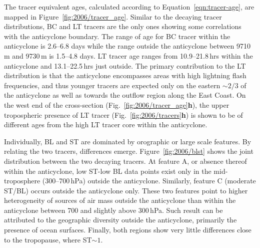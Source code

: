 
The tracer equivalent ages, calculated according to Equation~\ref{eqn:tracer-age}, are mapped in Figure~\ref{fig:2006/tracer_age}.
Similar to the decaying tracer distributions, BC and LT tracers are the only ones showing some correlations with the anticyclone boundary.
The range of age for BC tracer within the anticyclone is 2.6--6.8 days while the range outside the anticyclone between 9710\,\unit{m} and
9730\,\unit{m} is 1.5--4.8 days. LT tracer age ranges from 10.9--21.8\,\unit{hrs} within the anticyclone and 13.1--22.5\,\unit{hrs}
just outside. The primary contribution to the LT distribution is that the anticyclone encompasses areas with high lightning flash frequencies,
and thus younger tracers are expected only on the eastern $\sim2/3$ of the anticyclone as well as towards the outflow region along
the East Coast. On the west end of the cross-section (Fig.~\ref{fig:2006/tracer_age}{\bf h}), the upper tropospheric presence of LT tracer
(Fig.~\ref{fig:2006/tracers}{\bf h}) is shown to be of different ages from the high LT tracer core within the anticyclone.


Individually, BL and ST are dominated by orographic or large scale features. By relating the two tracers, differences emerge.
Figure~\ref{fig:2006/blst} shows the joint distribution between the two decaying tracers. At feature A, or absence thereof within the
anticyclone, low ST-low BL data points exist only in the mid-troposphere (300--700\,\unit{hPa}) outside the anticyclone. Similarly,
feature C (moderate ST/BL) occurs outside the anticyclone only. These two features point to higher heterogeneity of sources of air mass
outside the anticyclone than within the anticyclone between 700 and slightly above 300\,\unit{hPa}. Such result can be attributed to
the geographic diversity outside the anticyclone, primarily the presence of ocean surfaces. Finally, both regions show very little
differences close to the tropopause, where ST$\sim1$.


